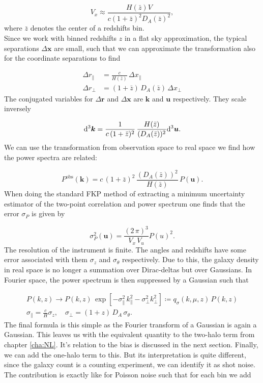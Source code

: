 \documentclass[../main.tex]{subfiles}
\begin{document}
\begin{equation*}
    V_x \approx \frac{H(\bar{z}) V}{c (1+\bar{z})^2 D_A(\bar{z})^2},
\end{equation*}
where $\bar{z}$ denotes the center of a redshifts bin.\\
Since we work with binned redshifts $z$ in a flat sky approximation, the typical separations $\Delta \boldsymbol{x}$ are small, such that we can approximate the transformation also for the coordinate  separations to find 

\begin{align}
    \Delta r_\|  &= \frac{c}{H(\bar{z})}\, \Delta x_\| \\
    \Delta r_\perp &= (1+\bar{z})\, D_A(\bar{z})\, \Delta x_\perp
\end{align}
 The conjugated variables for $\Delta\boldsymbol{ r}$ and $\Delta\boldsymbol{x}$ are $\boldsymbol{k}$ and $\boldsymbol{u}$ respectively. They scale inversely
 
 \begin{align}
    \mathrm{d}^3 \boldsymbol{k} = \frac{1}{c\,(1+\bar{z})^2} \, \frac{H(\bar{z})} {(D_A(\bar{z}))^2} \mathrm{d}^3 \boldsymbol{u}.
 \end{align}
 We can use the transformation from observation space to real space we find how the power spectra are related:
 
 \begin{equation}
    \label{eq:transform_power}
    P^\mathrm{obs}(\boldsymbol{k}) = c\,(1+\bar{z})^2\, \frac{(D_A(\bar{z}))^2}{H(\bar{z})}\,P(\boldsymbol{u}).
 \end{equation}
 When doing the standard FKP\cite{Feldman_1994} method of extracting a minimum uncertainty estimator of the two-point correlation and power spectrum one finds that the error $\sigma_P$ is given by 
 
 \begin{equation}
    \sigma^2_P(\boldsymbol{u})  = \frac{(2\,\pi)^3}{V_x\, V_u} P(u)^2.
 \end{equation}
 The resolution of the instrument is finite. The angles and redshifts have some error associated with them $\sigma_z$ and $\sigma_\theta$ respectively. Due to this, the galaxy density in real space is no longer a summation over Dirac-deltas but over Gaussians. In Fourier space, the power spectrum is then suppressed by a Gaussian such that

\begin{align}
    P(k,z) \to P(k,z)\,\exp\left[- \sigma_\|^2 \, k_\|^2 - \sigma_\perp^2 k_\perp^2 \right]\coloneq q_\sigma(k,\mu,z)\,P(k,z) \\
    \sigma_\| = \frac{c}{H} \sigma_z, \quad \sigma_\perp = (1+z)\,D_A \, \sigma_\theta. \nonumber
\end{align}
The final formula is this simple as the Fourier transform of a Gaussian is again a Gaussian. This leaves us with the equivalent quantity to the two-halo term from chapter \ref{cha:NL}. It's relation to the bias is discussed in the next section.
Finally, we can add the one-halo term to this. But its interpretation is quite different, since the galaxy count is a counting experiment, we can identify it as shot noise. The contribution is exactly like for Poisson noise such that for each bin we add 
\end{document}

